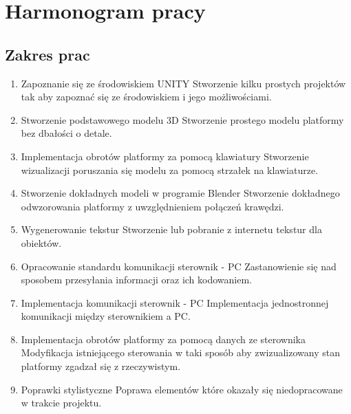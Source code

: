 \documentclass[10pt, a4paper]{article}
\begin{document}
\newpage
\section{Harmonogram pracy}

	\subsection{Zakres prac}
		\begin{enumerate}
			\item Zapoznanie się ze środowiskiem UNITY
			\newline
			Stworzenie kilku prostych projektów tak aby zapoznać się ze środowiskiem i jego możliwościami.
			
			\item Stworzenie podstawowego modelu 3D
			\newline
			Stworzenie prostego modelu platformy bez dbałości o detale.
			
			\item Implementacja obrotów platformy za pomocą klawiatury
			\newline
			Stworzenie wizualizacji poruszania się modelu za pomocą strzałek na klawiaturze.
			
			\item Stworzenie dokładnych modeli w programie Blender
			\newline
			Stworzenie dokładnego odwzorowania platformy z uwzględnieniem połączeń krawędzi.
			
			\item Wygenerowanie tekstur
			\newline
			Stworzenie lub pobranie z internetu tekstur dla obiektów.
			
			\item Opracowanie standardu komunikacji sterownik - PC
			\newline
			Zastanowienie się nad sposobem przesyłania informacji oraz ich kodowaniem.
			
			\item Implementacja komunikacji sterownik - PC
			\newline
			Implementacja jednostronnej komunikacji między sterownikiem a PC.
			
			\item Implementacja obrotów platformy za pomocą danych ze sterownika
			\newline
			Modyfikacja istniejącego sterowania w taki sposób aby zwizualizowany stan platformy zgadzał się z rzeczywistym.
			
			\item Poprawki stylistyczne
			\newline
			Poprawa elementów które okazały się niedopracowane w trakcie projektu.
		\end{enumerate}
	
\end{document}
